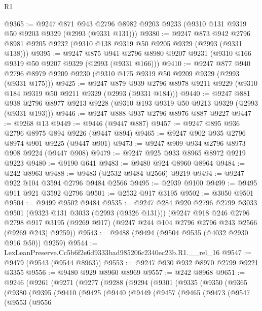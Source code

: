 \begin{lexlean}{R1}
\begin{coremodule}
@9365 := @9247
    @871
    @943
    @2796
    @8982
    @9203
    @9233
    (@9310 @131 @9319 @50 @9203 @9329 (@2993 (@9331 @131)))
@9380 := @9247
    @873
    @942
    @2796
    @8981
    @9205
    @9232
    (@9310 @138 @9319 @50 @9205 @9329 (@2993 (@9331 @138)))
@9395 := @9247
    @875
    @941
    @2796
    @8980
    @9207
    @9231
    (@9310 @166 @9319 @50 @9207 @9329 (@2993 (@9331 @166)))
@9410 := @9247
    @877
    @940
    @2796
    @8979
    @9209
    @9230
    (@9310 @175 @9319 @50 @9209 @9329 (@2993 (@9331 @175)))
@9425 := @9247
    @879
    @939
    @2796
    @8978
    @9211
    @9229
    (@9310 @184 @9319 @50 @9211 @9329 (@2993 (@9331 @184)))
@9440 := @9247
    @881
    @938
    @2796
    @8977
    @9213
    @9228
    (@9310 @193 @9319 @50 @9213 @9329 (@2993 (@9331 @193)))
@9446 := @9247 @888 @937 @2796 @8976 @887 @9227
@9447 := @9268 @13
@9449 := @9446 (@9447 @887)
@9457 := @9247 @895 @936 @2796 @8975 @894 @9226 (@9447 @894)
@9465 := @9247 @902 @935 @2796 @8974 @901 @9225 (@9447 @901)
@9473 := @9247 @909 @934 @2796 @8973 @908 @9224 (@9447 @908)
@9479 := @9247 @925 @933 @8965 @8972 @9219 @9223
@9480 := @9190 @641
@9483 := @9480 @924 @8960 @8964
@9484 := @242 @8963
@9488 := @9483 (@2532 @9484 @2566) @9219
@9494 := @9247 @922 @104 @3594 @2796 @9484 @2566
@9495 := @2939 @9100
@9499 := @9495 @911 @921 @3592 @2796
@9501 := @2532 @917 @3195
@9502 := @3050 @9501
@9504 := @9499 @9502 @9484
@9535 := @9247
    @284
    @920
    @2796
    @2799
    @3033
    @9501
    (@9323 @131 @3033 (@2993 (@9326 @131)))
    (@9247
      @918
      @246
      @2796
      @2798
      @917
      @3195
      (@9269 @917)
      (@9247 @244 @104 @2796 @2796 @243 @2566 (@9269 @243) @9259))
@9543 := @9488 (@9494 (@9504 @9535 (@4032 @2930 @916 @50)) @9259)
@9544 := LexLeanPreserve.Cc5b6f2e6d9333bad985206c2340ec23b.R1.__rel_16
@9547 := @9479 (@9543 (@9544 @8963))
@9553 := @9247 @930 @932 @8970 @2799 @9221 @3355
@9556 := @9480 @929 @8960 @8969
@9557 := @242 @8968
@9651 := @9246
    (@9261
      (@9271
        (@9277
          (@9288
            (@9294
              (@9301
                (@9335
                  (@9350
                    (@9365
                      (@9380
                        (@9395
                          (@9410
                            (@9425
                              (@9440
                                (@9449
                                  (@9457
                                    (@9465
                                      (@9473
                                        (@9547
                                          (@9553
                                            (@9556

\end{coremodule}
\end{lexlean}

